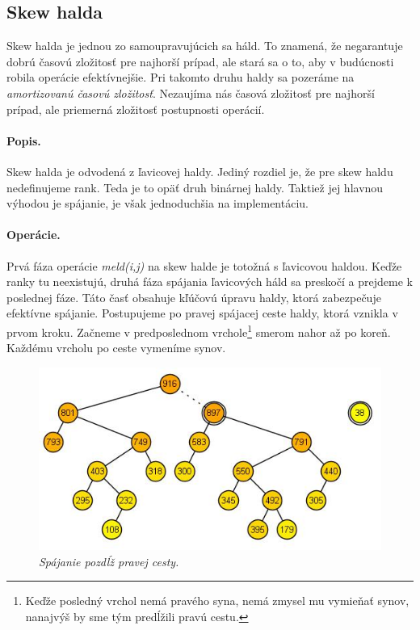 \subsection{Skew halda} 
Skew halda je jednou zo samoupravujúcich sa háld. To znamená, že negarantuje dobrú časovú zložitosť pre najhorší prípad, ale stará 
sa o to, aby v budúcnosti robila operácie efektívnejšie. Pri takomto druhu haldy sa pozeráme na \emph{amortizovanú časovú 
zložitosť}. Nezaujíma nás časová zložitosť pre najhorší prípad, ale priemerná zložitosť postupnosti operácií.

\paragraph{Popis.}
Skew halda je odvodená z ľavicovej haldy. Jediný rozdiel je, že pre skew haldu nedefinujeme rank. Teda je to opäť druh binárnej 
haldy. Taktiež jej hlavnou výhodou je spájanie, je však jednoduchšia na implementáciu.


\paragraph{Operácie.}
Prvá fáza operácie \emph{meld(i,j)} na skew halde je totožná s ľavicovou haldou. Keďže ranky tu neexistujú, druhá fáza spájania 
ľavicových háld sa preskočí a prejdeme k poslednej fáze. Táto časť obsahuje kľúčovú úpravu haldy, ktorá zabezpečuje efektívne 
spájanie. Postupujeme po pravej spájacej ceste haldy, ktorá vznikla v prvom kroku. Začneme v predposlednom vrchole\footnote{Keďže posledný vrchol nemá pravého syna, nemá zmysel mu vymieňať synov, nanajvýš by sme tým predĺžili pravú cestu.} smerom nahor až po koreň. Každému vrcholu po ceste vymeníme synov.


\begin{figure}
\includegraphics[width=\columnwidth]{obrazky/skewinsert.png}
\caption{\emph{Spájanie pozdĺž pravej cesty.}} 
\label{img:skew} 
\end{figure}

